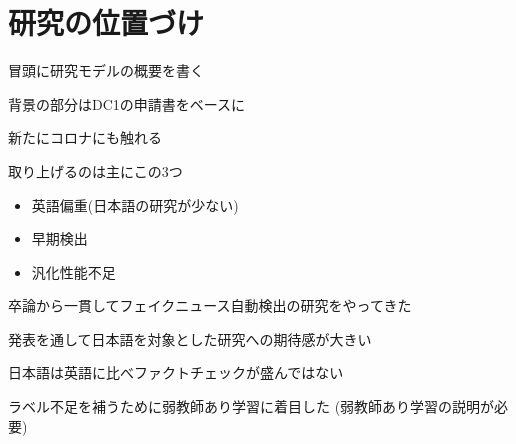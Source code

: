 
\section{研究の位置づけ}

冒頭に研究モデルの概要を書く

背景の部分はDC1の申請書をベースに

新たにコロナにも触れる

取り上げるのは主にこの3つ
\begin{itemize}
    \item 英語偏重(日本語の研究が少ない)
    \item 早期検出
    \item 汎化性能不足
\end{itemize}


卒論から一貫してフェイクニュース自動検出の研究をやってきた

発表を通して日本語を対象とした研究への期待感が大きい

日本語は英語に比べファクトチェックが盛んではない

ラベル不足を補うために弱教師あり学習に着目した
(弱教師あり学習の説明が必要)
\vspace{1cm}


